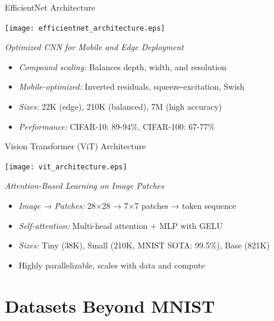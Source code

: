 \begin{slide}[\slideopts,toc={EfficientNet}]{EfficientNet Architecture}
  
  \centerline{\texttt{[image: efficientnet\_architecture.eps]}}

  \emph{Optimized CNN for Mobile and Edge Deployment}
  
  \begin{itemize}
    \item \emph{Compound scaling:} Balances depth, width, and resolution
    
    \item \emph{Mobile-optimized:} Inverted residuals, squeeze-excitation, Swish
    
    \item \emph{Sizes:} 22K (edge), 210K (balanced), 7M (high accuracy)
    
    \item \emph{Performance:} CIFAR-10: 89-94\%, CIFAR-100: 67-77\%
  \end{itemize}
  
\end{slide}

\begin{slide}[\slideopts,toc={ViT}]{Vision Transformer (ViT) Architecture}
  
  \centerline{\texttt{[image: vit\_architecture.eps]}}

  \emph{Attention-Based Learning on Image Patches}
  
  \begin{itemize}
    \item \emph{Image → Patches:} 28×28 → 7×7 patches → token sequence
    
    \item \emph{Self-attention:} Multi-head attention + MLP with GELU
    
    \item \emph{Sizes:} Tiny (38K), Small (210K, MNIST SOTA: 99.5\%), Base (821K)
    
    \item Highly parallelizable, scales with data and compute
  \end{itemize}
  
\end{slide}

\section[toc={New Dataset Formats}]{Datasets Beyond MNIST}

